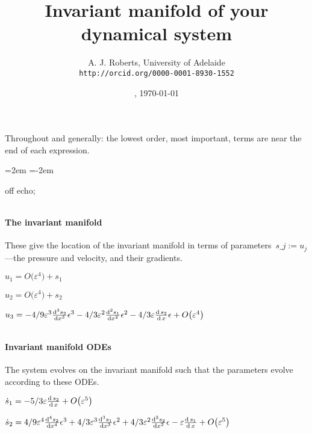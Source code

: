 \documentclass[11pt,a5paper]{article}
\title{Invariant manifold of your dynamical system}
\author{A. J. Roberts, University of Adelaide\\
\texttt{http://orcid.org/0000-0001-8930-1552}}
\date{\now, \today}
\begin{document}
\maketitle
Throughout and generally: the lowest order, most
important, terms are near the end of each expression.
\par\leftskip=2em  \parindent=-2em


off echo;

\(
\)
\paragraph{The invariant manifold}
These give the location of the invariant manifold in
terms of parameters~\(s\_ j:=u_j\)---the pressure and velocity, and their gradients.
\(
\)\par
\(u_{1}=O\big(\varepsilon ^{4}\big)+s_{1}
\)\par
\(u_{2}=O\big(\varepsilon ^{4}\big)+s_{2}
\)\par
\(u_{3}=-4/9 \varepsilon^{3} \frac{{\rm d}^{3}s_{2}}{{\rm d}x^{3}} \epsilon ^{3}-
4/3 \varepsilon^{2} \frac{{\rm d}^{2}s_{1}}{{\rm d}x^{2}} \epsilon ^{2}-4/3 
\varepsilon \frac{{\rm d}\,s_{2}}{{\rm d}\,x} \epsilon +O\big(\varepsilon ^{4}
\big)
\)\par
\(
\)
\paragraph{Invariant manifold ODEs}
The system evolves on the invariant manifold such
that the parameters evolve according to these ODEs.
\(
\)\par
\(\dot s_{1}=-5/3 \varepsilon \frac{{\rm d}\,s_{2}}{{\rm d}\,x}+O\big(
\varepsilon ^{5}\big)
\)\par
\(\dot s_{2}=4/9 \varepsilon^{4} \frac{{\rm d}^{4}s_{2}}{{\rm d}x^{4}} \epsilon 
^{3}+4/3 \varepsilon^{3} \frac{{\rm d}^{3}s_{1}}{{\rm d}x^{3}} \epsilon ^{2}+4/
3 \varepsilon^{2} \frac{{\rm d}^{2}s_{2}}{{\rm d}x^{2}} \epsilon -\varepsilon \frac{
{\rm d}\,s_{1}}{{\rm d}\,x}+O\big(\varepsilon ^{5}\big)
\)\par
\(
\)
\end{document}
